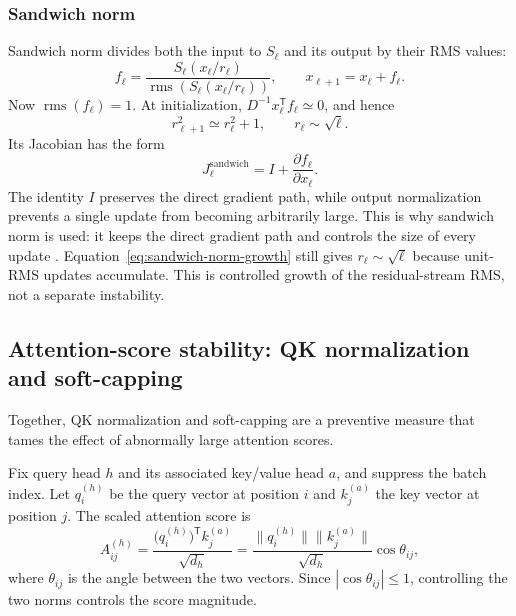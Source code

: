 \documentclass[11pt]{article}
\begin{document}
\subsubsection*{Sandwich norm}
Sandwich norm divides both the input to $S_\ell$ and its output by their RMS
values:
\begin{equation}
  f_\ell=
  \frac{S_\ell(x_\ell/r_\ell)}
       {\operatorname{rms}\!\left(S_\ell(x_\ell/r_\ell)\right)},
  \qquad
  x_{\ell+1}=x_\ell+f_\ell.
\end{equation}
Now $\operatorname{rms}(f_\ell)=1$.  At initialization,
$D^{-1}x_\ell^{\mathsf T}f_\ell\simeq0$, and hence
\begin{equation}
  r_{\ell+1}^2\simeq r_\ell^2+1,
  \qquad r_\ell\sim\sqrt{\ell}.
  \label{eq:sandwich-norm-growth}
\end{equation}
Its Jacobian has the form
\begin{equation}
  J_\ell^{\mathrm{sandwich}}
  =I+\frac{\partial f_\ell}{\partial x_\ell}.
\end{equation}
The identity $I$ preserves the direct gradient path, while output normalization
prevents a single update from becoming arbitrarily large.  This is why
sandwich norm is used: it keeps the direct gradient path and controls the size
of every update \citep{microsoftai2026maithinking}.
Equation~\eqref{eq:sandwich-norm-growth} still
gives $r_\ell\sim\sqrt{\ell}$ because unit-RMS updates accumulate.  This is
controlled growth of the residual-stream RMS, not a separate instability.

\subsection{Attention-score stability: QK normalization and soft-capping}

Together, QK normalization and soft-capping are a preventive measure that
tames the effect of abnormally large attention scores.

Fix query head $h$ and its associated key/value head $a$, and suppress the
batch index.  Let $q_i^{(h)}$ be the query vector at position $i$ and
$k_j^{(a)}$ the key vector at position $j$.  The scaled attention score is
\begin{equation}
  A_{ij}^{(h)}
  =\frac{\bigl(q_i^{(h)}\bigr)^{\mathsf T}k_j^{(a)}}{\sqrt{d_h}}
  =\frac{\lVert q_i^{(h)}\rVert
          \lVert k_j^{(a)}\rVert}{\sqrt{d_h}}\cos\theta_{ij},
  \label{eq:logit-norm-product}
\end{equation}
where $\theta_{ij}$ is the angle between the two vectors.  Since
$|\cos\theta_{ij}|\leq1$, controlling the two norms controls the score
magnitude.
\end{document}

